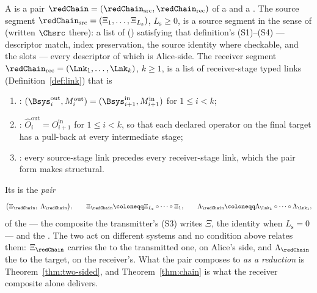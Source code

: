 \begin{definition}\label{def:chain}
A
is a pair $\redChain=(\redChain_{\mathrm{src}},\redChain_{\mathrm{rec}})$ of
a  and a
.
The source segment
$\redChain_{\mathrm{src}}=(\Xi_1,\dots,\Xi_{L_{\mathrm s}})$, $L_{\mathrm s}\ge0$,
is a source segment in the sense of 
(written $\Chsrc$ there): a list of 
() satisfying that definition's
 (S1)--(S4) --- descriptor match, index
preservation, the source identity where checkable, and the slots --- every
descriptor of which is Alice-side. The receiver segment
$\redChain_{\mathrm{rec}}=(\Lnk_1,\dots,\Lnk_k)$, $k\ge1$, is a list of
receiver-stage typed links (Definition~\ref{def:link}) that is
\begin{enumerate}[label=(C\arabic*),leftmargin=3.0em]
\item
  :
  $(\Bsys^{\mathrm{out}}_i,M^{\mathrm{out}}_i)
  =(\Bsys^{\mathrm{in}}_{i+1},M^{\mathrm{in}}_{i+1})$ for $1\le i<k$;
\item
  :
  $\hat O^{\mathrm{out}}_i=O^{\mathrm{in}}_{i+1}$ for
  $1\le i<k$, so that each declared operator on the final target has a
  pull-back at every intermediate stage;
\item
  :
  every \textsf{source}-stage link precedes every \textsf{receiver}-stage
  link, which the pair form makes structural.
\end{enumerate}
Its
is the \emph{pair}
\begin{equation}\label{eq:chaincomposite}
  \big(\Xi_{\redChain},\ \Lambda_{\redChain}\big),
  \qquad
  \Xi_{\redChain}\coloneqq\Xi_{L_{\mathrm s}}\circ\dots\circ\Xi_1 ,
  \qquad
  \Lambda_{\redChain}\coloneqq\Lambda_{\Lnk_k}\circ\dots\circ\Lambda_{\Lnk_1},
\end{equation}
of the
--- the composite the transmitter's (S3) writes $\Xi$, the identity when
$L_{\mathrm s}=0$ --- and the
.
The two act on different systems and no condition above relates them:
$\Xi_{\redChain}$ carries the  to the
transmitted one, on Alice's side, and $\Lambda_{\redChain}$ the
 to the target, on the receiver's. What the pair
composes to \emph{as a reduction} is Theorem~\ref{thm:two-sided}, and
Theorem~\ref{thm:chain} is what the receiver composite alone delivers.


\end{definition}

